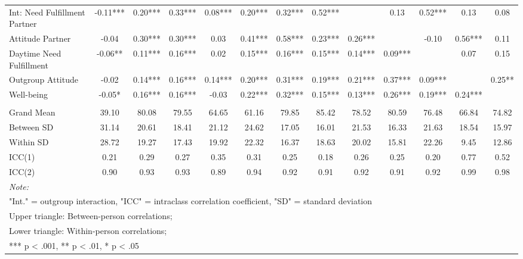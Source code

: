 \begin{sidewaystable*}[!hbtp]
{\begin{tabular}[t]{lcccccccccccc}
\hspace{1em}Int: Need Fulfillment Partner & -0.11*** & 0.20*** & 0.33*** & 0.08*** & 0.20*** & 0.32*** & 0.52*** &  & 0.13 & 0.52*** & 0.13 & 0.08\\
\hspace{1em}Attitude Partner & -0.04 & 0.30*** & 0.30*** & 0.03 & 0.41*** & 0.58*** & 0.23*** & 0.26*** &  & -0.10 & 0.56*** & 0.11\\
\hspace{1em}Daytime Need Fulfillment & -0.06** & 0.11*** & 0.16*** & 0.02 & 0.15*** & 0.16*** & 0.15*** & 0.14*** & 0.09*** &  & 0.07 & 0.15\\
\hspace{1em}Outgroup Attitude & -0.02 & 0.14*** & 0.16*** & 0.14*** & 0.20*** & 0.31*** & 0.19*** & 0.21*** & 0.37*** & 0.09*** &  & 0.25**\\
\hspace{1em}Well-being & -0.05* & 0.16*** & 0.16*** & -0.03 & 0.22*** & 0.32*** & 0.15*** & 0.13*** & 0.26*** & 0.19*** & 0.24*** & \\
\addlinespace[0.3em]
\multicolumn{13}{l}{\textbf{Descriptives}}\\
\hspace{1em}Grand Mean & 39.10 & 80.08 & 79.55 & 64.65 & 61.16 & 79.85 & 85.42 & 78.52 & 80.59 & 76.48 & 66.84 & 74.82\\
\hspace{1em}Between SD & 31.14 & 20.61 & 18.41 & 21.12 & 24.62 & 17.05 & 16.01 & 21.53 & 16.33 & 21.63 & 18.54 & 15.97\\
\hspace{1em}Within SD & 28.72 & 19.27 & 17.43 & 19.92 & 22.32 & 16.37 & 18.63 & 20.02 & 15.81 & 22.26 & 9.45 & 12.86\\
\hspace{1em}ICC(1) & 0.21 & 0.29 & 0.27 & 0.35 & 0.31 & 0.25 & 0.18 & 0.26 & 0.25 & 0.20 & 0.77 & 0.52\\
\hspace{1em}ICC(2) & 0.90 & 0.93 & 0.93 & 0.89 & 0.94 & 0.92 & 0.91 & 0.92 & 0.91 & 0.92 & 0.99 & 0.98\\
\bottomrule
\multicolumn{13}{l}{\rule{0pt}{1em}\textit{Note: }}\\
\multicolumn{13}{l}{\rule{0pt}{1em}"Int." = outgroup interaction, "ICC" = intraclass correlation coefficient, "SD" = standard deviation}\\
\multicolumn{13}{l}{\rule{0pt}{1em}Upper triangle: Between-person correlations;}\\
\multicolumn{13}{l}{\rule{0pt}{1em}Lower triangle: Within-person correlations;}\\
\multicolumn{13}{l}{\rule{0pt}{1em}*** p < .001, ** p < .01,  * p < .05}\\
\end{tabular}}
\end{sidewaystable*}
